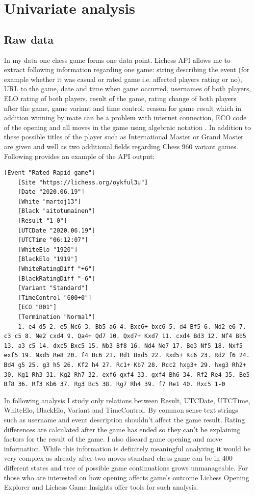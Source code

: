 \section{Univariate analysis}
\label{sec:univariate}

\subsection{Raw data}

In my data one chess game forms one data point. Lichess API allows me to extract following information regarding one game: string describing the event (for example whether it was casual or rated game i.e. affected players rating \cite{elo} or no), URL to the game, date and time when game occurred, usernames of both players, ELO rating of both players, result of the game, rating change of both players after the game, game variant and time control, reason for game result which in addition winning by mate can be a problem with internet connection, ECO code \cite{eco} of the opening and all moves in the game using algebraic notation \cite{notation}. In addition to these possible titles of the player such as International Master or Grand Master are given and well as two additional fields regarding Chess 960 variant games. Following provides an example of the API output:

\begin{lstlisting}[breaklines]
    [Event "Rated Rapid game"]
    [Site "https://lichess.org/oykful3u"]
    [Date "2020.06.19"]
    [White "martoj13"]
    [Black "aitotumainen"]
    [Result "1-0"]
    [UTCDate "2020.06.19"]
    [UTCTime "06:12:07"]
    [WhiteElo "1920"]
    [BlackElo "1919"]
    [WhiteRatingDiff "+6"]
    [BlackRatingDiff "-6"]
    [Variant "Standard"]
    [TimeControl "600+0"]
    [ECO "B01"]
    [Termination "Normal"]
    1. e4 d5 2. e5 Nc6 3. Bb5 a6 4. Bxc6+ bxc6 5. d4 Bf5 6. Nd2 e6 7. c3 c5 8. Ne2 cxd4 9. Qa4+ Qd7 10. Qxd7+ Kxd7 11. cxd4 Bd3 12. Nf4 Bb5 13. a3 c5 14. dxc5 Bxc5 15. Nb3 Bf8 16. Nd4 Ne7 17. Be3 Nf5 18. Nxf5 exf5 19. Nxd5 Re8 20. f4 Bc6 21. Rd1 Bxd5 22. Rxd5+ Kc6 23. Rd2 f6 24. Bd4 g5 25. g3 h5 26. Kf2 h4 27. Rc1+ Kb7 28. Rcc2 hxg3+ 29. hxg3 Rh2+ 30. Kg1 Rh3 31. Kg2 Rh7 32. exf6 gxf4 33. gxf4 Bh6 34. Rf2 Re4 35. Be5 Bf8 36. Rf3 Kb6 37. Rg3 Bc5 38. Rg7 Rh4 39. f7 Re1 40. Rxc5 1-0
\end{lstlisting}

In following analysis I study only relations between Result, UTCDate, UTCTime, WhiteElo, BlackElo, Variant and TimeControl. By common sense text strings such as username and event description shouldn't affect the game result. Rating differences are calculated after the game has ended so they can't be explaining factors for the result of the game. I also discard game opening and move information. While this information is definitely meaningful analyzing it would be very complex as already after two moves standard chess game can be in 400 different states and tree of possible game continuations grows unmanageable. For those who are interested on how opening affects game's outcome Lichess Opening Explorer \cite{opening_explorer} and Lichess Game Insights \cite{insights} offer tools for such analysis.

